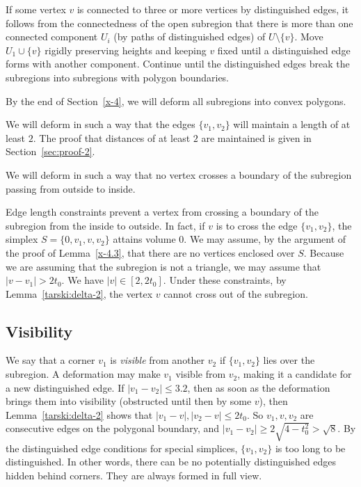 If some vertex $v$ is connected to three or more vertices by
distinguished edges, it follows from the connectedness of the open
subregion that there is more than one connected component $U_i$ (by
paths of distinguished edges) of $U\setminus\{v\}$. Move $U_1\cup \{v\}$
rigidly preserving heights and keeping $v$ fixed until a distinguished
edge forms with another component. Continue until the distinguished
edges break the subregions into subregions with polygon boundaries.


By the end of Section~\ref{x-4}, we will deform all subregions into
convex polygons.

\begin{remark}
    \label{remark:proof-2}
We will deform in such a way that the edges $\{v_1,v_2\}$ will maintain a
length of at least $2$. The proof that distances of at least $2$ are
maintained is given in Section~\ref{sec:proof-2}.

We will deform in such a way that no vertex  crosses a boundary of the
subregion passing from outside to inside.
\end{remark}

Edge length constraints prevent a vertex from crossing a boundary of the
subregion from the inside to outside.  In fact, if $v$ is to cross the
edge $\{v_1,v_2\}$, the simplex $S=\{0,v_1,v,v_2\}$ attains volume 0.  We
may assume, by the argument of the proof of Lemma~\ref{x-4.3}, that
there are no vertices enclosed over $S$. Because we are assuming that
the subregion is not a triangle, we may assume that $|v-v_1|>2t_0$. We
have $|v|\in[2,2t_0]$.  Under these constraints,
by Lemma~\ref{tarski:delta-2}, the vertex $v$ cannot cross out of the subregion.




\subsection{Visibility}



We say that a corner $v_1$ is {\it visible} from another $v_2$ if
$\{v_1,v_2\}$ lies over the subregion.  A deformation may make $v_1$
visible from $v_2$, making it a candidate for a new distinguished edge.
If $|v_1-v_2|\le 3.2$, then as soon as the deformation brings them into
visibility (obstructed until then by some $v$), then
Lemma~\ref{tarski:delta-2} shows that $|v_1-v|,|v_2-v|\le2t_0$. So
$v_1,v,v_2$ are consecutive edges on the polygonal boundary, and
$|v_1-v_2|\ge 2\sqrt{4-t_0^2} > \sqrt{8}$. By the distinguished edge
conditions for special simplices, $\{v_1,v_2\}$ is too long to be
distinguished.  In other words, there can be no potentially
distinguished edges hidden behind corners. They are always formed in
full view.



